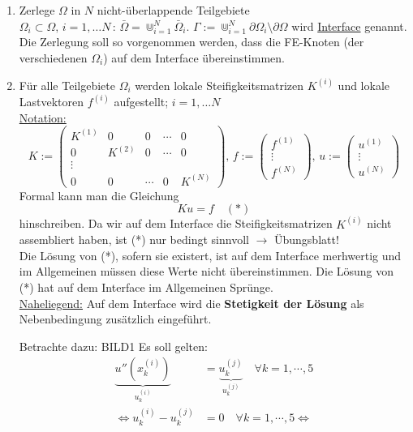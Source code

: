 \begin{enumerate}
\item
Zerlege $\Omega$ in $N$ nicht-überlappende Teilgebiete $\Omega_i \subset \Omega,\, i=1,\dots N \, : \, \bar \Omega = \Cup_{i=1}^N \bar \Omega_i $. $ \Gamma := \Cup_{i=1}^N \partial \Omega_i \setminus \partial \Omega$ wird \underline{Interface} genannt.\\
Die Zerlegung soll so vorgenommen werden, dass die FE-Knoten (der verschiedenen $\Omega_i$) auf dem Interface übereinstimmen.
\item
Für alle Teilgebiete $\Omega_i$ werden lokale Steifigkeitsmatrizen $K^{(i)}$ und lokale Lastvektoren $f^{(i)}$ aufgestellt; $i=1,\dots N$\\
\underline{Notation:}
\[ K:= \begin{pmatrix}  K^{(1)} & 0 & 0 & \cdots & 0 \\
				0 & K^{(2)}   & 0 & \cdots  &0 \\
				\vdots\\
				 0 & 0 & \cdots & 0 & K^{(N)}
	\end{pmatrix}, \,
  f:= \begin{pmatrix} f^{(1)} \\ \vdots \\ f^{(N)} \end{pmatrix}, \, u:=  \begin{pmatrix} u^{(1)} \\ \vdots \\ u^{(N)} \end{pmatrix}
\]
Formal kann man die Gleichung 
\begin{equation}
Ku=f \quad (*)
\end{equation}
hinschreiben. Da wir auf dem Interface die Steifigkeitsmatrizen $K^{(i)}$ nicht assembliert haben, ist (*) nur bedingt sinnvoll $\rightarrow$ Übungsblatt!\\
Die Lösung von (*), sofern sie existert, ist auf dem Interface merhwertig und im Allgemeinen müssen diese Werte nicht übereinstimmen. Die Lösung von (*) hat auf dem Interface im Allgemeinen Sprünge.\\
\underline{Naheliegend:} Auf dem Interface wird die \textbf{Stetigkeit der Lösung} als Nebenbedingung zusätzlich eingeführt.


Betrachte dazu:
BILD1
Es soll gelten: 
\begin{align}
  \underbrace{u''(x^{(i)}_k)}_{u_k^{(i)}} &= \underbrace{u^{(j)}_k}_{u_k^{(j)}} \quad \forall k=1,\cdots,5\\
  \Leftrightarrow u_k^{(i)} - u^{(j)}_k &= 0 \quad \forall k=1,\cdots,5
  \Leftrightarrow 


\end{align}
\end{enumerate}
